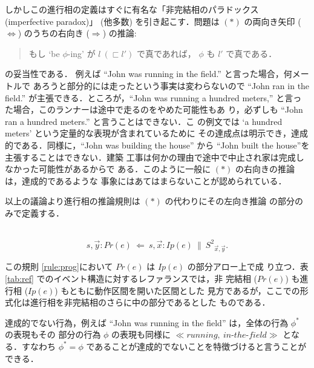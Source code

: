 しかしこの進行相の定義はすぐに有名な「非完結相のパラドックス (imperfective
paradox)」\cite{Partee84,Dowty79,Blackburn96,Glasbey96}
(他多数) を引き起こす．問題は $(\ast)$ の両向き矢印 
($\Leftrightarrow$) のうちの右向き ($\Rightarrow$) の推論:  
\begin{quote}
もし `be $\phi$-ing' が $l~( \sqsubset l')$ で真であれば， 
$\phi$ も $l'$ で真である．
\end{quote}
の妥当性である．
例えば ``John was running in the field.'' と言った場合，何メートルで
あろうと部分的には走ったという事実は変わらないので ``John ran in the
field.'' が主張できる．ところが，``John was running a hundred
meters,'' と言った場合，このランナーは途中で走るのをやめた可能性もあ
り，必ずしも ``John ran a hundred meters.'' と言うことはできない．こ
の例文では `a hundred meters' という定量的な表現が含まれているために
その達成点は明示でき，達成的である．同様に，``John was building the
house'' から ``John built the house''を主張することはできない．建築
工事は何かの理由で途中で中止され家は完成しなかった可能性があるからで
ある．このように一般に $(\ast)$ の右向きの推論は，達成的であるような
事象にはあてはまらないことが認められている．

以上の議論より進行相の推論規則は $(\ast)$ の代わりにその左向き推論
の部分のみで定義する．
\begin{my-rule}[進行相]\label{rule:prog}~
\[ s,{\vec y} \colon Pr(e) ~\Leftarrow~s,{\vec
x}\colon Ip(e)~\|~{S^{2}}_{{\vec x},{\vec y}}.\]
\end{my-rule}
この規則 \ref{rule:prog}において $Pr(e)$ は $Ip(e)$ の部分アロー上で成
り立つ．表 \ref{tab:ref} でのイベント構造に対するレファランスでは，非
完結相 ($Pr(e)$) も進行相 ($Ip(e)$) もともに動作区間を開いた区間とした
見方であるが，ここでの形式化は進行相を非完結相のさらに中の部分であるとした
ものである．

達成的でない行為，例えば ``John
was running in the field'' は，全体の行為 $\phi^{\ast}$ の表現もその
部分の行為 $\phi$ の表現も同様に $\ll running,
~in\mbox{-}the\mbox{-}field \gg$ となる．すなわち $\phi^{\ast} = 
\phi$ であることが達成的でないことを特徴づけると言うことができる．

